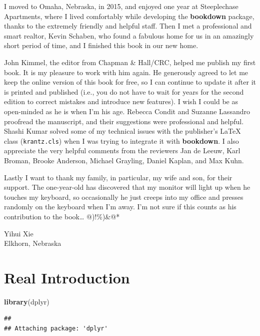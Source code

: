 \documentclass[
  12pt,
]{krantz}
\newenvironment{Shaded}{\begin{snugshade}}{\end{snugshade}}
\newcommand{\FunctionTok}[1]{\textcolor[rgb]{0.13,0.29,0.53}{\textbf{#1}}}
\newcommand{\NormalTok}[1]{#1}
\begin{document}
I moved to Omaha, Nebraska, in 2015, and enjoyed one year at Steeplechase Apartments, where I lived comfortably while developing the \textbf{bookdown} package, thanks to the extremely friendly and helpful staff. Then I met a professional and smart realtor, Kevin Schaben, who found a fabulous home for us in an amazingly short period of time, and I finished this book in our new home.

John Kimmel, the editor from Chapman \& Hall/CRC, helped me publish my first book. It is my pleasure to work with him again. He generously agreed to let me keep the online version of this book for free, so I can continue to update it after it is printed and published (i.e., you do not have to wait for years for the second edition to correct mistakes and introduce new features). I wish I could be as open-minded as he is when I'm his age. Rebecca Condit and Suzanne Lassandro proofread the manuscript, and their suggestions were professional and helpful. Shashi Kumar solved some of my technical issues with the publisher's LaTeX class (\texttt{krantz.cls}) when I was trying to integrate it with \textbf{bookdown}. I also appreciate the very helpful comments from the reviewers Jan de Leeuw, Karl Broman, Brooke Anderson, Michael Grayling, Daniel Kaplan, and Max Kuhn.

Lastly I want to thank my family, in particular, my wife and son, for their support. The one-year-old has discovered that my monitor will light up when he touches my keyboard, so occasionally he just creeps into my office and presses randomly on the keyboard when I'm away. I'm not sure if this counts as his contribution to the book\ldots{} @)!\%)\&@*

\begin{flushright}
Yihui Xie\\
Elkhorn, Nebraska
\end{flushright}

\hypertarget{real-introduction}{%
\chapter{Real Introduction}\label{real-introduction}}

\begin{Shaded}
\begin{Highlighting}[]
\FunctionTok{library}\NormalTok{(dplyr)}
\end{Highlighting}
\end{Shaded}

\begin{verbatim}
## 
## Attaching package: 'dplyr'
\end{verbatim}
\end{document}
